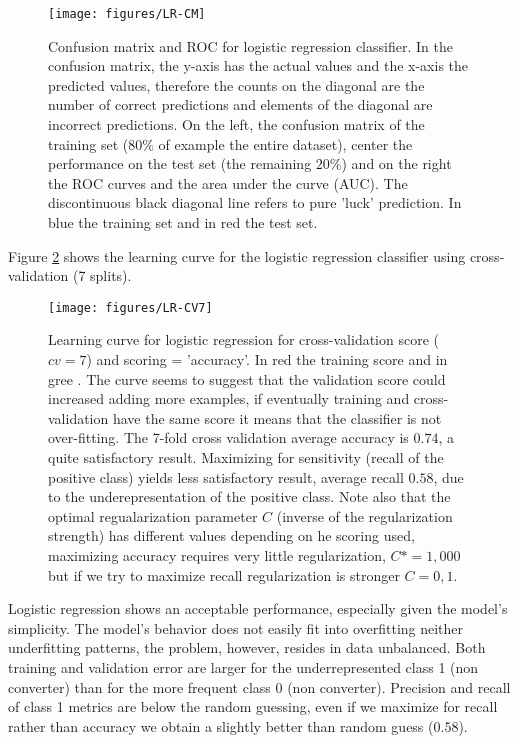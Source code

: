 \documentclass[11pt]{article}
\theoremstyle{definition}
\theoremstyle{remark}
\begin{document}
\begin{figure}[H]
        \centering
        \texttt{[image: figures/LR-CM]}
        \caption{Confusion matrix and ROC for logistic regression classifier. In the confusion matrix, the y-axis has the actual values and the x-axis the predicted values, therefore the counts on the diagonal are the number of correct predictions and elements of the diagonal are incorrect predictions.
        On the left, the confusion matrix of the training set ($80\%$ of example the entire dataset), center the performance on the test set (the remaining $20\%$) and on the right the ROC curves and the area under the curve (AUC). The discontinuous black diagonal line refers to pure 'luck' prediction. In blue the training set and in red the test set.}
\label{fig:lr-cm}
\end{figure}

Figure \ref{fig:lr-cv7} shows the learning curve for the logistic regression classifier using cross-validation (7 splits).
\begin{figure}[H]
        \centering
        \texttt{[image: figures/LR-CV7]}
        \caption{Learning curve for logistic regression for cross-validation score ($cv=7$) and scoring = 'accuracy'. In red the training score and in gree . The curve seems to suggest that the validation score could increased adding more examples, if eventually training and cross-validation have the same score it means that the classifier is not over-fitting. 
		The 7-fold cross validation average accuracy is $0.74$, a quite satisfactory result. Maximizing for sensitivity (recall of the positive class) yields less satisfactory result, average recall $0.58$, due to the underepresentation of the positive class. Note also that the optimal regualarization parameter $C$ (inverse of the regularization strength) has different values depending on he scoring used, maximizing accuracy requires very little regularization, $C*=1,000$ but if we try to maximize recall regularization is stronger $C= 0,1$. 
        } \label{fig:lr-cv7}
\end{figure}

Logistic regression shows an acceptable performance, especially given the model's simplicity. 
The model's behavior does not easily fit into overfitting neither underfitting patterns, the problem, however, resides in data unbalanced. Both training and validation error are larger for the underrepresented class 1 (non converter) than for the more frequent class 0 (non converter). Precision and recall of class 1 metrics are below the random guessing, even if we maximize for recall rather than accuracy we obtain a slightly better than random guess ($0.58$). 
\end{document}
